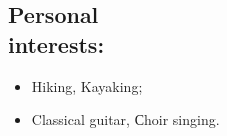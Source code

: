 \documentclass[margin, 10pt]{res} %
\begin{document}
\begin{resume}
\section{Personal \\ interests:}
\begin{itemize}
\item Hiking, Kayaking;
\item Classical guitar, Сhoir singing.
\end{itemize}

\end{resume}
\end{document}

